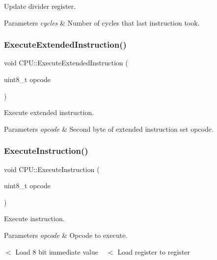 Update divider register. 


\begin{DoxyParams}{Parameters}
{\em cycles} & Number of cycles that last instruction took. \\
\hline
\end{DoxyParams}
\mbox{\label{classCPU_ac2cebcf2ac957a884175b94ff5f62c15}} 
\subsubsection{\texorpdfstring{Execute\+Extended\+Instruction()}{ExecuteExtendedInstruction()}}
{\footnotesize\ttfamily void C\+P\+U\+::\+Execute\+Extended\+Instruction (\begin{DoxyParamCaption}\item[{uint8\+\_\+t}]{opcode }\end{DoxyParamCaption})}



Execute extended instruction. 


\begin{DoxyParams}{Parameters}
{\em opcode} & Second byte of extended instruction set opcode. \\
\hline
\end{DoxyParams}
\mbox{\label{classCPU_ad8e103aaedd1c250d33f9cc373f2f16b}} 
\subsubsection{\texorpdfstring{Execute\+Instruction()}{ExecuteInstruction()}}
{\footnotesize\ttfamily void C\+P\+U\+::\+Execute\+Instruction (\begin{DoxyParamCaption}\item[{uint8\+\_\+t}]{opcode }\end{DoxyParamCaption})}



Execute instruction. 


\begin{DoxyParams}{Parameters}
{\em opcode} & Opcode to execute. \\
\hline
\end{DoxyParams}
$<$ Load 8 bit immediate value ~\newline
 $<$ Load register to register \mbox{\label{classCPU_a852335312c1040d2fcde2a690443d425}} 
